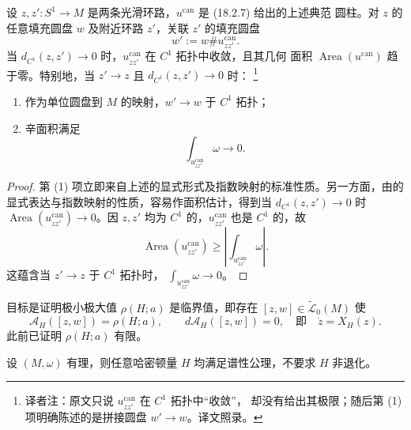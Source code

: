 \begin{lemma}
\label{lem:21-canonical-cylinder-area}
设 $z,z':S^1\to M$ 是两条光滑环路，$u^{\mathrm{can}}$ 是 (18.2.7) 给出的上述典范
圆柱。对 $z$ 的任意填充圆盘 $w$ 及附近环路 $z'$，关联 $z'$ 的填充圆盘
\[
 w':=w\#u_{zz'}^{\mathrm{can}}.
\]
当 $d_{C^1}(z,z')\to0$ 时，$u_{zz'}^{\mathrm{can}}$ 在 $C^1$ 拓扑中收敛，且其几何
面积 $\operatorname{Area}(u^{\mathrm{can}})$ 趋于零。特别地，当 $z'\to z$ 且
$d_{C^1}(z,z')\to0$ 时：
\footnote{译者注：原文只说 $u_{zz'}^{\mathrm{can}}$ 在 $C^1$ 拓扑中“收敛”，
却没有给出其极限；随后第 (1) 项明确陈述的是拼接圆盘 $w'\to w$。译文照录。}
\begin{enumerate}[label=(\arabic*)]
 \item 作为单位圆盘到 $M$ 的映射，$w'\to w$ 于 $C^1$ 拓扑；
 \item 辛面积满足
 \begin{equation}
  \int_{u_{zz'}^{\mathrm{can}}}\omega\longrightarrow0.
  \label{eq:21-thin-cylinder-symplectic-area}
 \end{equation}
\end{enumerate}
\end{lemma}

\begin{proof}
第 (1) 项立即来自上述\termCanonicalThinCylinder{}的显式形式及指数映射的标准性质。另一方面，由\termCanonicalThinCylinder{}的显式表达与指数映射的性质，容易作面积估计，得到当
$d_{C^1}(z,z')\to0$ 时 $\operatorname{Area}(u_{zz'}^{\mathrm{can}})\to0$。因
$z,z'$ 均为 $C^1$ 的，$u_{zz'}^{\mathrm{can}}$ 也是 $C^1$ 的，故
\[
 \operatorname{Area}(u_{zz'}^{\mathrm{can}})
 \geq\left|\int_{u_{zz'}^{\mathrm{can}}}\omega\right|.
\]
这蕴含当 $z'\to z$ 于 $C^1$ 拓扑时，
$\int_{u_{zz'}^{\mathrm{can}}}\omega\to0$。
\end{proof}

目标是证明极小极大值 $\rho(H;a)$ 是临界值，即存在
$[z,w]\in\widetilde{\mathcal L}_0(M)$ 使
\[
 \mathcal A_H([z,w])=\rho(H;a),\qquad
 d\mathcal A_H([z,w])=0,
 \quad\text{即}\quad \dot z=X_H(z).
\]
此前已证明 $\rho(H;a)$ 有限。

\begin{theorem}
\label{thm:21-rational-spectrality}
设 $(M,\omega)$ 有理，则任意哈密顿量 $H$ 均满足谱性公理，不要求 $H$ 非退化。
\end{theorem}

